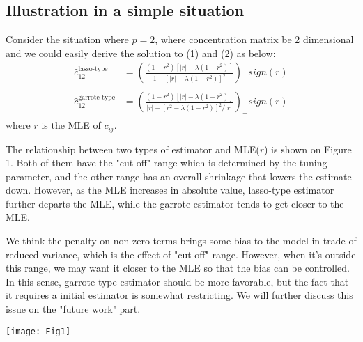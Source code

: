 \subsection*{Illustration in a simple situation}
Consider the situation where $p=2$, where concentration matrix be 2 dimensional and we could easily derive the solution to (1) and (2) as below:
\begin{align*}
    \hat{c}_{12}^{\text{lasso-type}} &= \left( \frac{(1-r^2)[|r| - \lambda(1-r^2)]}{1 - [|r| - \lambda (1 - r^2)]^2} \right)_+ sign(r) \tag{3} \\
    \hat{c}_{12}^{\text{garrote-type}} &= \left( \frac{(1-r^2)[|r| - \lambda(1-r^2)]}{|r| - [r^2 - \lambda (1 - r^2)]^2/|r|} \right)_+ sign(r) \tag{4} 
\end{align*}
where $r$ is the MLE of $c_{ij}$. 

The relationship between two types of estimator and MLE($r$) is shown on Figure 1. Both of them have the "cut-off" range which is determined by the tuning parameter, and the other range has an overall shrinkage that lowers the estimate down. However, as the MLE increases in absolute value, lasso-type estimator further departs the MLE, while the garrote estimator tends to get closer to the MLE. 

We think the penalty on non-zero terms brings some bias to the model in trade of reduced variance, which is the effect of "cut-off" range. However, when it's outside this range, we may want it closer to the MLE so that the bias can be controlled. In this sense, garrote-type estimator should be more favorable, but the fact that it requires a initial estimator is somewhat restricting. We will further discuss this issue on the "future work" part.

\begin{center}
\texttt{[image: Fig1]}
\end{center}